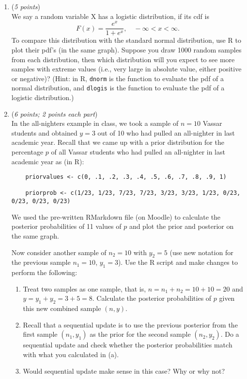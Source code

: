 \documentclass[11pt]{article}
\begin{document}
\begin{enumerate}
    \item ({\it{5 points}})\\
    We say a random variable X has a logistic distribution, if its cdf is
    \[
    F(x) = \frac{e^x}{1 + e^x}, \quad -\infty < x < \infty.
    \]
    To compare this distribution with the standard normal distribution, use R to plot their pdf's (in the same graph).
    Suppose you draw 1000 random samples from each distribution,
    then which distribution will you expect to see more samples with
    extreme values (i.e., very large in absolute value, either positive or negative)? (Hint: in R, \texttt{dnorm} is the function to evaluate the pdf of a normal distribution, and \texttt{dlogis} is the function to evaluate the pdf of a logistic distribution.)


   \item ({\it{6 points; 2 points each part}})\\
    In the all-nighters example in class, we took a sample of $n = 10$ Vassar students and obtained $y = 3$ out of 10 who had pulled an all-nighter in last academic year. Recall that we came up with a prior distribution for the percentage $p$ of all Vassar students who had pulled an all-nighter in last academic year as (in R):
    
    \begin{verbatim}
    priorvalues <- c(0, .1, .2, .3, .4, .5, .6, .7, .8, .9, 1)
    
    priorprob <- c(1/23, 1/23, 7/23, 7/23, 3/23, 3/23, 1/23, 0/23, 0/23, 0/23, 0/23)
    \end{verbatim}
    
    We used the pre-written RMarkdown file (on Moodle) to calculate the posterior probabilities of 11 values of $p$ and plot the prior and posterior on the same graph.
    
    Now consider another sample of $n_2 = 10$ with $y_2 = 5$ (use new notation for the previous sample $n_1 = 10$, $y_1 = 3$). Use the R script and make changes to perform the following:
    
    \begin{enumerate}
    \item Treat two samples as one sample, that is, $n = n_1 + n_2 = 10 + 10 = 20$ and $y = y_1 + y_2 = 3 + 5 = 8$. Calculate the posterior probabilities of $p$ given this new combined sample $(n, y)$.
    
    \item Recall that a sequential update is to use the previous posterior from the first sample $(n_1, y_1)$ as the prior for the second sample $(n_2, y_2)$. Do a sequential update and check whether the posterior probabilities match with what you calculated in (a). 
    
    \item Would sequential update make sense in this case? Why or why not?
    \end{enumerate}
    
    
    
\end{enumerate}
\end{document}
